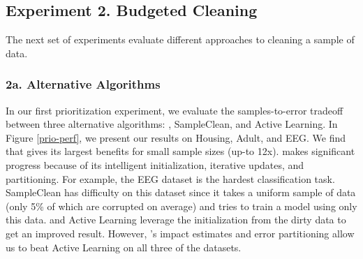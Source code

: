 \subsection{Experiment 2. Budgeted Cleaning}
The next set of experiments evaluate different approaches to cleaning a sample of data.

\subsubsection{2a. Alternative Algorithms}
In our first prioritization experiment, we evaluate the samples-to-error tradeoff between three alternative algorithms: \sys, SampleClean, and Active Learning.
In Figure \ref{prio-perf}, we present our results on Housing, Adult, and EEG. 
We find that \sys gives its largest benefits for small sample sizes (up-to 12x).
\sys makes significant progress because of its intelligent initialization, iterative updates, and partitioning.
For example, the EEG dataset is the hardest classification task.
SampleClean has difficulty on this dataset since it takes a uniform sample of data (only 5\% of which are corrupted on average) and tries to train a model using only this data.
\sys and Active Learning leverage the initialization from the dirty data to get an improved result. 
However, \sys's impact estimates and error partitioning allow us to beat Active Learning on all three of the datasets.


